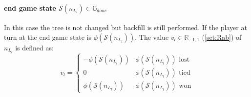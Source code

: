 \documentclass[12pt]{article}
\newcommand{\quckeq}[1]{(\ref{#1})}
\begin{document}
\paragraph{end game state \(\mathcal S(n_{L_l}) \in \mathbb G_{done}\)}
In this case the tree is not changed but backfill is still performed. If the player at turn at the end game state is \(\phi(\mathcal S(n_{L_l}))\).
The value \(v_l \in \mathbb R_{-1,1}\) \quckeq{set:Rab} of \(n_{L_l}\) is defined as:
\begin{equation}
v_l = \left\{\begin{matrix}
-\phi(\mathcal S(n_{L_l}))  &\phi(\mathcal S(n_{L_l})) \text{ lost}\\
0 				            &\phi(\mathcal S(n_{L_l})) \text{ tied}\\ 
\phi(\mathcal S(n_{L_l})) &\phi(\mathcal S(n_{L_l})) \text{ won}
\end{matrix}\right.
\end{equation}
\end{document}

